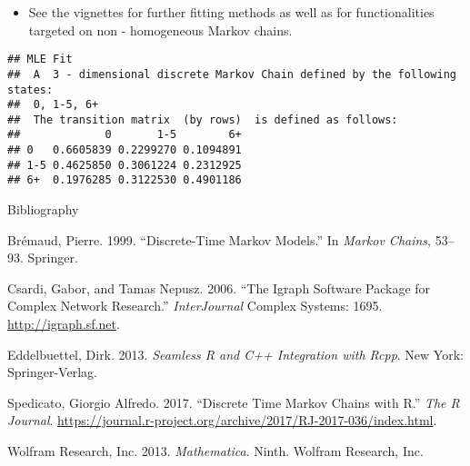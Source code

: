 \documentclass[ignorenonframetext,]{beamer}
\newenvironment{Shaded}{\begin{snugshade}}{\end{snugshade}}
\newcommand{\NormalTok}[1]{#1}
\newcommand{\OperatorTok}[1]{\textcolor[rgb]{0.81,0.36,0.00}{\textbf{#1}}}
\providecommand{\tightlist}{%
  \setlength{\itemsep}{0pt}\setlength{\parskip}{0pt}}
\providecommand{\tightlist}{
  \setlength{\itemsep}{0pt}\setlength{\parskip}{0pt}
}
\begin{document}
\begin{frame}[fragile]

\begin{itemize}
\tightlist
\item
  See the vignettes for further fitting methods as well as for
  functionalities targeted on non - homogeneous Markov chains.
\end{itemize}

\begin{Shaded}
\end{Shaded}

\begin{verbatim}
## MLE Fit 
##  A  3 - dimensional discrete Markov Chain defined by the following states: 
##  0, 1-5, 6+ 
##  The transition matrix  (by rows)  is defined as follows: 
##             0       1-5        6+
## 0   0.6605839 0.2299270 0.1094891
## 1-5 0.4625850 0.3061224 0.2312925
## 6+  0.1976285 0.3122530 0.4901186
\end{verbatim}

\end{frame}

\begin{frame}[allowframebreaks]{Bibliography}
\protect\hypertarget{bibliography}{}

\hypertarget{refs}{}
\leavevmode\hypertarget{ref-bremaud1999discrete}{}%
Brémaud, Pierre. 1999. ``Discrete-Time Markov Models.'' In \emph{Markov
Chains}, 53--93. Springer.

\leavevmode\hypertarget{ref-pkg:igraph}{}%
Csardi, Gabor, and Tamas Nepusz. 2006. ``The Igraph Software Package for
Complex Network Research.'' \emph{InterJournal} Complex Systems: 1695.
\url{http://igraph.sf.net}.

\leavevmode\hypertarget{ref-RcppR}{}%
Eddelbuettel, Dirk. 2013. \emph{Seamless R and C++ Integration with
Rcpp}. New York: Springer-Verlag.

\leavevmode\hypertarget{ref-pkg:markovchain}{}%
Spedicato, Giorgio Alfredo. 2017. ``Discrete Time Markov Chains with
R.'' \emph{The R Journal}.
\url{https://journal.r-project.org/archive/2017/RJ-2017-036/index.html}.

\leavevmode\hypertarget{ref-mathematica9}{}%
Wolfram Research, Inc. 2013. \emph{Mathematica}. Ninth. Wolfram
Research, Inc.

\end{frame}
\end{document}
